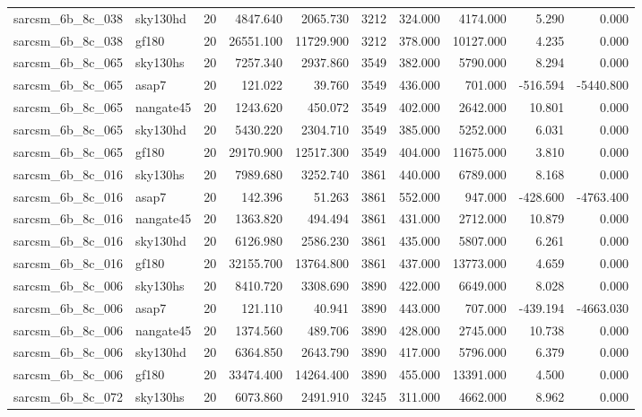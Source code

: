 \documentclass{article}
\begin{document}
\begin{longtable}{llrrrrrrrr}
sarcsm\_6b\_8c\_038 & sky130hd & 20 & 4847.640 & 2065.730 & 3212 & 324.000 & 4174.000 & 5.290 & 0.000 \\
sarcsm\_6b\_8c\_038 & gf180 & 20 & 26551.100 & 11729.900 & 3212 & 378.000 & 10127.000 & 4.235 & 0.000 \\
sarcsm\_6b\_8c\_065 & sky130hs & 20 & 7257.340 & 2937.860 & 3549 & 382.000 & 5790.000 & 8.294 & 0.000 \\
sarcsm\_6b\_8c\_065 & asap7 & 20 & 121.022 & 39.760 & 3549 & 436.000 & 701.000 & -516.594 & -5440.800 \\
sarcsm\_6b\_8c\_065 & nangate45 & 20 & 1243.620 & 450.072 & 3549 & 402.000 & 2642.000 & 10.801 & 0.000 \\
sarcsm\_6b\_8c\_065 & sky130hd & 20 & 5430.220 & 2304.710 & 3549 & 385.000 & 5252.000 & 6.031 & 0.000 \\
sarcsm\_6b\_8c\_065 & gf180 & 20 & 29170.900 & 12517.300 & 3549 & 404.000 & 11675.000 & 3.810 & 0.000 \\
sarcsm\_6b\_8c\_016 & sky130hs & 20 & 7989.680 & 3252.740 & 3861 & 440.000 & 6789.000 & 8.168 & 0.000 \\
sarcsm\_6b\_8c\_016 & asap7 & 20 & 142.396 & 51.263 & 3861 & 552.000 & 947.000 & -428.600 & -4763.400 \\
sarcsm\_6b\_8c\_016 & nangate45 & 20 & 1363.820 & 494.494 & 3861 & 431.000 & 2712.000 & 10.879 & 0.000 \\
sarcsm\_6b\_8c\_016 & sky130hd & 20 & 6126.980 & 2586.230 & 3861 & 435.000 & 5807.000 & 6.261 & 0.000 \\
sarcsm\_6b\_8c\_016 & gf180 & 20 & 32155.700 & 13764.800 & 3861 & 437.000 & 13773.000 & 4.659 & 0.000 \\
sarcsm\_6b\_8c\_006 & sky130hs & 20 & 8410.720 & 3308.690 & 3890 & 422.000 & 6649.000 & 8.028 & 0.000 \\
sarcsm\_6b\_8c\_006 & asap7 & 20 & 121.110 & 40.941 & 3890 & 443.000 & 707.000 & -439.194 & -4663.030 \\
sarcsm\_6b\_8c\_006 & nangate45 & 20 & 1374.560 & 489.706 & 3890 & 428.000 & 2745.000 & 10.738 & 0.000 \\
sarcsm\_6b\_8c\_006 & sky130hd & 20 & 6364.850 & 2643.790 & 3890 & 417.000 & 5796.000 & 6.379 & 0.000 \\
sarcsm\_6b\_8c\_006 & gf180 & 20 & 33474.400 & 14264.400 & 3890 & 455.000 & 13391.000 & 4.500 & 0.000 \\
sarcsm\_6b\_8c\_072 & sky130hs & 20 & 6073.860 & 2491.910 & 3245 & 311.000 & 4662.000 & 8.962 & 0.000 \\

\end{longtable}
\end{document}

